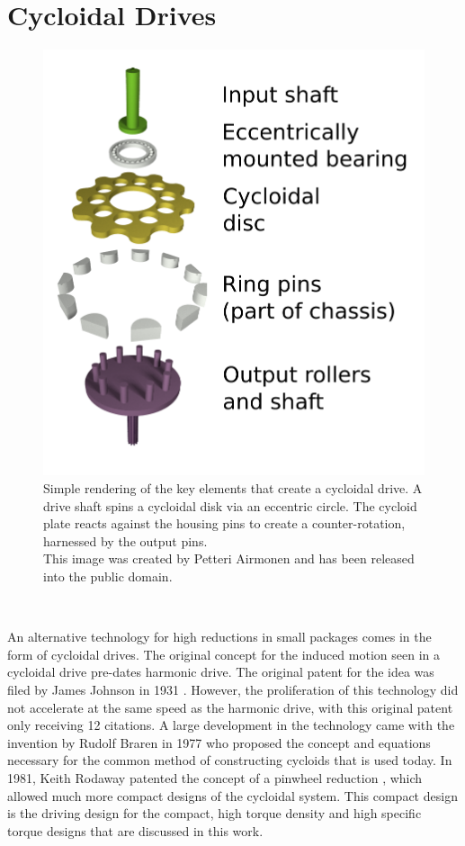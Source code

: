 \section{Cycloidal Drives} \label{intro:cycloid}

\begin{figure}[h]
   \centering
   \includegraphics[width=0.60\linewidth]{fig/Cycloidal_drive_parts}
   \caption{Simple rendering of the key elements that create a cycloidal drive.
   A drive shaft spins a cycloidal disk via an eccentric circle.
   The cycloid plate reacts against the housing pins to create a counter-rotation, harnessed by the output pins. 
   \\This image was created by Petteri Airmonen and has been released into the public domain.}
   \label{fig:cycloid_cartoon}
\end{figure}
\\

An alternative technology for high reductions in small packages comes in the form of cycloidal drives. The original concept for the induced motion seen in a cycloidal drive pre-dates harmonic drive. The original patent for the idea was filed by James Johnson in 1931 \cite{ref:cycloid_original}. However, the proliferation of this technology did not accelerate at the same speed as the harmonic drive, with this original patent only receiving 12 citations. A large development in the technology came with the invention by Rudolf Braren in 1977 \cite{ref:cycloid_one_stage} who proposed the concept and equations necessary for the common method of constructing cycloids that is used today. In 1981, Keith Rodaway patented the concept of a pinwheel reduction \cite{ref:cycloid_pinwheel}, which allowed much more compact designs of the cycloidal system. This compact design is the driving design for the compact, high torque density and high specific torque designs that are discussed in this work.

